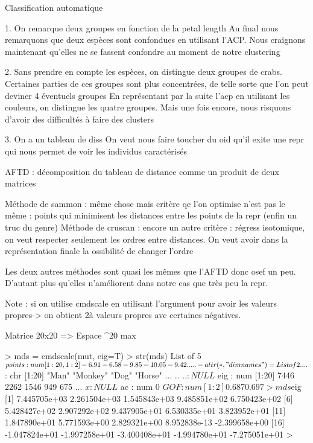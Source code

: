 Classification automatique

1. On remarque deux groupes en fonction de la petal length
Au final nous remarquons que deux espèces sont confondues en utilisant l'ACP.
Nous craignons maintenant qu'elles ne se fassent confondre au moment de notre
clustering

2. Sans prendre en compte les espèces, on distingue deux groupes de crabs.
Certaines parties de ces groupes sont plus concentrées, de telle sorte que l'on
peut deviner 4 éventuels groupes
En représentant par la suite l'acp en utilisant les couleurs, on distingue les
quatre groupes. Mais une fois encore, nous risquons d'avoir des difficultés à
faire des clusters

3.
On a un tableau de diss
On veut nous faire toucher du oid qu'il exite une repr qui nous permet de voir
les individus caractérisés

AFTD : décomposition du tableau de distance comme un produit de deux matrices

Méthode de sammon : même chose mais critère qe l'on optimise n'est pas le même :
points qui minimisent les distances entre les points de la repr (enfin un truc
du genre)
Méthode de cruscan : encore un autre critère : régress isotomique, on veut
respecter seulement les ordres entre distances. On veut avoir dans la
représentation finale la ossibilité de changer l'ordre


Les deux autres méthodes sont quasi les mêmes que l'AFTD donc osef un peu.
D'autant plus qu'elles n'améliorent dans notre cas que très peu la repr.

Note : si on utilise cmdscale en utilisant l'argument pour avoir les valeurs
propres-> on obtient 2à valeurs propres avc certaines négatives.

Matrice 20x20 => Espace ^20 max

> mds = cmdscale(mut, eig=T)
> str(mds)
List of 5
 $ points: num [1:20, 1:2] -6.91 -6.58 -9.85 -10.05 -9.42 ...
   ..- attr(*, "dimnames")=List of 2
     .. ..$ : chr [1:20] "Man" "Monkey" "Dog" "Horse" ...
       .. ..$ : NULL
        $ eig   : num [1:20] 7446 2262 1546 949 675 ...
         $ x     : NULL
          $ ac    : num 0
           $ GOF   : num [1:2] 0.687 0.697
           > mds$eig
            [1]  7.445705e+03  2.261504e+03  1.545843e+03  9.485851e+02
            6.750423e+02
             [6]  5.428427e+02  2.907292e+02  9.437905e+01  6.530335e+01
             3.823952e+01
             [11]  1.847890e+01  5.771593e+00  2.829321e+00  8.952838e-13
             -2.399658e+00
             [16] -1.047824e+01 -1.997258e+01 -3.400408e+01 -4.994780e+01
             -7.275051e+01
             >

